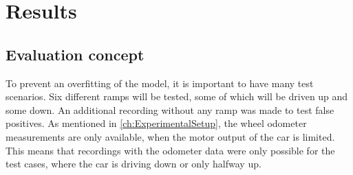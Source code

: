 \chapter{Results}
\label{ch:Results}

\section{Evaluation concept}
To prevent an overfitting of the model, it is important to have many test scenarios.
Six different ramps will be tested, some of which will be driven up and some down.
An additional recording without any ramp was made to test false positives.
As mentioned in \cref{ch:ExperimentalSetup}, the wheel odometer measurements are only available, when the motor output of the car is limited.
This means that recordings with the odometer data were only possible for the test cases, where the car is driving down or only halfway up.



